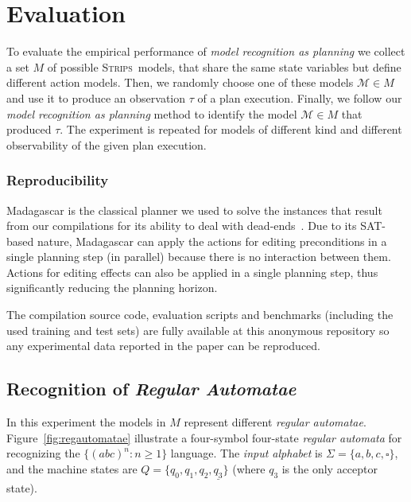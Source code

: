 \documentclass[letterpaper]{article} %
\newcommand{\strips}{\textsc{Strips}}     %
\begin{document}
\section{Evaluation}
\label{sec:evaluation}
To evaluate the empirical performance of {\em model recognition as planning} we collect a set $M$ of possible \strips\ models, that share the same state variables but define different action models. Then, we randomly choose one of these models $\mathcal{M}\in M$ and use it to produce an observation $\tau$ of a plan execution. Finally, we follow our {\em model recognition as planning} method to identify the model $\mathcal{M}\in M$ that produced $\tau$. The experiment is repeated for models of different kind and different observability of the given plan execution.


\subsubsection{Reproducibility}
{\sc Madagascar} is the classical planner we used to solve the instances that result from our compilations for its ability to deal with dead-ends~\cite{rintanen2014madagascar}. Due to its SAT-based nature, {\sc Madagascar} can apply the actions for editing preconditions in a single planning step (in parallel) because there is no interaction between them. Actions for editing effects can also be applied in a single planning step, thus significantly reducing the planning horizon.

The compilation source code, evaluation scripts and benchmarks (including the used training and test sets) are fully available at this anonymous repository {\em } so any experimental data reported in the paper can be reproduced.

\subsection{Recognition of {\em Regular Automatae}}
In this experiment the models in $M$ represent different {\em regular automatae}. Figure~\ref{fig:regautomatae} illustrate a four-symbol four-state {\em regular automata} for recognizing the $\{(abc)^n : n \geq 1 \}$ language. The {\em input alphabet} is $\Sigma=\{a,b,c,\square\}$, and the machine states are $Q=\{q_0,q_1,q_2,\underline{q_3}\}$ (where \underline{$q_3$} is the only acceptor state).
\end{document}
